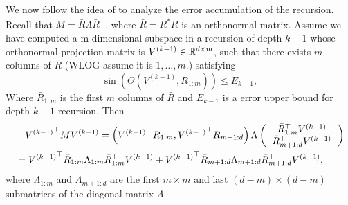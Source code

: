 We now follow the idea of \citet{vempala2014max} to analyze the error accumulation of the recursion.
Recall that $M = \bar{R}\Lambda\bar{R}^{\top}$, where $\bar{R} = R^*R$ is an orthonormal matrix.
Assume we have computed a m-dimensional subspace in a recursion of depth $k-1$ whose orthonormal projection matrix is $V^{(k-1)} \in \mathbb{R}^{d\times m}$, such that there exists $m$ columns of $\bar{R}$ (WLOG assume it is $1,\ldots,m$.) satisfying
\[
\sin\left(\Theta\left(V^{(k-1)}, \bar{R}_{1:m}\right)\right) \le E_{k-1},
\] 
Where $\bar{R}_{1:m}$ is the first $m$ columns of $\bar{R}$ and $E_{k-1}$ is a error upper bound for depth $k-1$ recursion.
Then
\begin{align*}
& \quad {V^{(k-1)}}^\top MV^{(k-1)} = \left( {V^{(k-1)}}^\top\bar{R}_{1:m}, {V^{(k-1)}}^\top\bar{R}_{m+1:d}\right)\Lambda
\left(
\begin{tabular}{c}
$\bar{R}_{1:m}^{\top} V^{(k-1)}$ \\
$\bar{R}_{m+1:d}^{\top} V^{(k-1)}$
\end{tabular}
\right) \\
& = {V^{(k-1)}}^\top\bar{R}_{1:m}\Lambda_{1:m} \bar{R}_{1:m}^{\top} V^{(k-1)} + {V^{(k-1)}}^\top\bar{R}_{m+1:d}\Lambda_{m+1:d}\bar{R}_{m+1:d}^{\top} V^{(k-1)},
\end{align*}
where $\Lambda_{1:m}$ and $\Lambda_{m+1:d}$ are the first $m\times m$  and last $(d-m)\times (d-m)$ submatrices of the diagonal matrix $\Lambda$.

